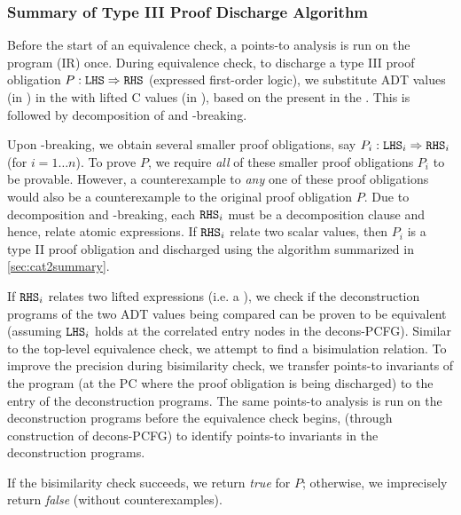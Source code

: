 \subsubsection{Summary of Type III Proof Discharge Algorithm}
\label{sec:cat3summary}

Before the start of an equivalence check, a points-to analysis is run on the \cprog{} program (IR) once.
During equivalence check, to discharge a type III proof obligation $P: {\tt LHS}{} \Rightarrow {\tt RHS}{}$
(expressed first-order logic), we substitute ADT values (in \sprog{}) in the \rhs{} with
lifted C values (in \cprog{}), based on the \recursiveRelations{} present in the \lhs{}.
This is followed by decomposition of \rhs{} and \rhs{}-breaking.

Upon \rhs{}-breaking, we obtain several smaller proof obligations,
say $P_i : {\tt LHS}{}_i \Rightarrow {\tt RHS}{}_i$ (for $i=1\ldots n$).
To prove $P$, we require {\em all} of these smaller proof obligations $P_i$ to be provable.
However, a counterexample to {\em any} one of these proof obligations would also be
a counterexample to the original proof obligation $P$.
Due to decomposition and \rhs{}-breaking, each ${\tt RHS}{}_i$ must be a decomposition clause
and hence, relate atomic expressions.
If ${\tt RHS}{}_i$ relate two scalar values, then $P_i$ is a type II proof obligation and
discharged using the algorithm summarized in \cref{sec:cat2summary}.

If ${\tt RHS}{}_i$ relates two lifted expressions (i.e. a \recursiveRelation{}),
we check if the deconstruction programs of the two ADT values being compared
can be proven to be equivalent (assuming ${\tt LHS}{}_i$ holds at the correlated entry nodes
in the decons-PCFG).
Similar to the top-level equivalence check, we attempt to find a bisimulation relation.
To improve the precision during bisimilarity check, we transfer points-to invariants of the \cprog{}
program (at the PC where the proof obligation is being discharged) to the entry of the
deconstruction programs. The same points-to analysis is run on the deconstruction
programs before the equivalence check begins, (through construction of decons-PCFG)
to identify points-to invariants in the deconstruction programs.

If the bisimilarity check succeeds, we return {\em true} for $P$;
otherwise, we imprecisely return {\em false} (without counterexamples).



